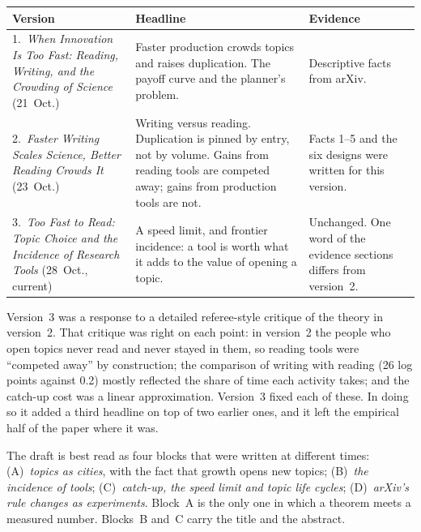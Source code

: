 \begin{center}\small
\begin{tabularx}{\textwidth}{@{}P{1.2in}LL@{}}
\toprule
Version & Headline & Evidence \\
.\ \emph{When Innovation Is Too Fast: Reading, Writing, and the Crowding of Science} (21~Oct.) & Faster production crowds topics and raises duplication. The payoff curve and the planner's problem. & Descriptive facts from arXiv. \\
2.\ \emph{Faster Writing Scales Science, Better Reading Crowds It} (23~Oct.) & Writing versus reading. Duplication is pinned by entry, not by volume. Gains from reading tools are competed away; gains from production tools are not. & Facts 1--5 and the six designs were written for this version. \\
3.\ \emph{Too Fast to Read: Topic Choice and the Incidence of Research Tools} (28~Oct., current) & A speed limit, and frontier incidence: a tool is worth what it adds to the value of opening a topic. & Unchanged. One word of the evidence sections differs from version~2. \\
\bottomrule
\end{tabularx}
\end{center}

Version~3 was a response to a detailed referee-style critique of the theory in version~2. That critique was right on each point: in version~2 the people who open topics never read and never stayed in them, so reading tools were ``competed away'' by construction; the comparison of writing with reading (26 log points against 0.2) mostly reflected the share of time each activity takes; and the catch-up cost was a linear approximation. Version~3 fixed each of these. In doing so it added a third headline on top of two earlier ones, and it left the empirical half of the paper where it was.

\begin{keybox}
The draft is best read as four blocks that were written at different times:
(A)~\emph{topics as cities}, with the fact that growth opens new topics;
(B)~\emph{the incidence of tools};
(C)~\emph{catch-up, the speed limit and topic life cycles};
(D)~\emph{arXiv's rule changes as experiments}.
Block~A is the only one in which a theorem meets a measured number. Blocks~B and~C carry the title and the abstract.
\end{keybox}
